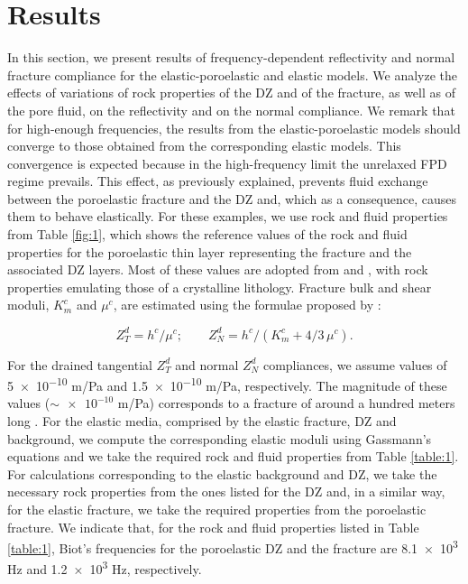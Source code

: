 \documentclass[draft]{agujournal2019}
\begin{document}
\section{Results}

In  this section, we present results of frequency-dependent reflectivity and normal fracture compliance for the elastic-poroelastic and elastic models. 
We analyze the effects of variations of rock properties of the DZ and of the fracture, as well as of the pore fluid, on the reflectivity and on the normal compliance.
We remark that for high-enough frequencies, the results from the elastic-poroelastic models should converge to those obtained from the corresponding elastic models. This convergence is expected because in the high-frequency limit the unrelaxed FPD regime prevails. This effect, as previously explained, prevents fluid exchange between the poroelastic fracture and the DZ and, which as a consequence, causes them to behave elastically.
For these examples, we use rock and fluid properties from Table \ref{fig:1}, which
shows the reference values of the rock and fluid properties for the poroelastic thin layer representing the fracture and the associated DZ layers. Most of these values are adopted from   and , with rock properties emulating those of a crystalline lithology. Fracture bulk and shear moduli, $K_{m}^c$ and $\mu^c$, are estimated using the formulae proposed by :
\begin{linenomath*}
\begin{equation} \label{Eq.24}
Z_T^d=h^c/\mu^c ; \qquad Z_N^d=h^c/(K_{m}^c + 4/3 \, \mu^c).
\end{equation}
\end{linenomath*}
For the drained tangential $Z_T^d$ and normal $Z_N^d$ compliances, we assume values of  \num{5e-10} m/Pa and \num{1.5e-10} m/Pa, respectively. The magnitude of these values ($\sim \num {e-10}$ m/Pa) corresponds to a fracture of around a hundred meters long \cite{Hobday2012}.
For the elastic media, comprised by the elastic fracture, DZ and background, we compute the corresponding elastic moduli using Gassmann's equations \cite{Gassmann1951} and we take the required rock and fluid properties from Table \ref{table:1}. For calculations corresponding to the elastic background and DZ, we take the necessary rock properties from the ones listed for the DZ and, in a similar way, for the elastic fracture, we take the required properties from the poroelastic fracture. We indicate that, for the rock and fluid properties listed in Table \ref{table:1}, Biot's frequencies for the poroelastic DZ and the fracture are \num{8.1e3} Hz and \num{1.2e3} Hz, respectively.
\end{document}
